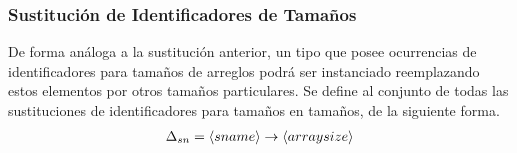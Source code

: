 \subsubsection{Sustitución de Identificadores de Tamaños}

De forma análoga a la sustitución anterior, un tipo que posee ocurrencias de identificadores para tamaños de arreglos podrá ser instanciado reemplazando estos elementos por otros tamaños particulares.
Se define al conjunto de todas las sustituciones de identificadores para tamaños en tamaños, de la siguiente forma.
\begin{gather*}
\Delta_{sn} = \langle sname \rangle \rightarrow \langle arraysize \rangle
\end{gather*}

